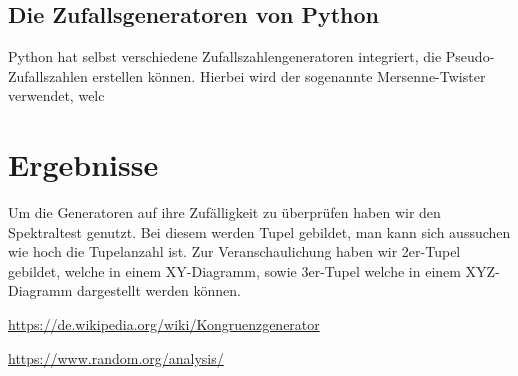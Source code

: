 \documentclass[12pt]{article}
\begin{document}
    \subsection{Die Zufallsgeneratoren von Python}\label{subsec:die-zufallsgeneratoren-von-python}
    Python hat selbst verschiedene Zufallszahlengeneratoren integriert, die Pseudo-Zufallszahlen erstellen können.
    Hierbei wird der sogenannte Mersenne-Twister verwendet, welc







    \section{Ergebnisse}\label{sec:Ergebnisse}
    Um die Generatoren auf ihre Zufälligkeit zu überprüfen haben wir den Spektraltest genutzt.
    Bei diesem werden Tupel gebildet, man kann sich aussuchen wie hoch die Tupelanzahl ist.
    Zur Veranschaulichung haben wir 2er-Tupel gebildet, welche in einem XY-Diagramm, sowie 3er-Tupel welche in einem
    XYZ-Diagramm dargestellt werden können.

    \vfill

    \begin{thebibliography}{12345}

        \url{https://de.wikipedia.org/wiki/Kongruenzgenerator}

        \url{https://www.random.org/analysis/}

    \end{thebibliography}
\end{document}

